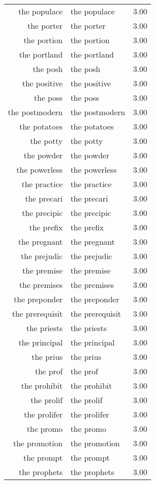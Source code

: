 \begin{table}[ht]
\begin{tabular}{rlr}
  the populace & the populace & 3.00 \\ 
  the porter & the porter & 3.00 \\ 
  the portion & the portion & 3.00 \\ 
  the portland & the portland & 3.00 \\ 
  the posh & the posh & 3.00 \\ 
  the positive & the positive & 3.00 \\ 
  the poss & the poss & 3.00 \\ 
  the postmodern & the postmodern & 3.00 \\ 
  the potatoes & the potatoes & 3.00 \\ 
  the potty & the potty & 3.00 \\ 
  the powder & the powder & 3.00 \\ 
  the powerless & the powerless & 3.00 \\ 
  the practice & the practice & 3.00 \\ 
  the precari & the precari & 3.00 \\ 
  the precipic & the precipic & 3.00 \\ 
  the prefix & the prefix & 3.00 \\ 
  the pregnant & the pregnant & 3.00 \\ 
  the prejudic & the prejudic & 3.00 \\ 
  the premise & the premise & 3.00 \\ 
  the premises & the premises & 3.00 \\ 
  the preponder & the preponder & 3.00 \\ 
  the prerequisit & the prerequisit & 3.00 \\ 
  the priests & the priests & 3.00 \\ 
  the principal & the principal & 3.00 \\ 
  the prius & the prius & 3.00 \\ 
  the prof & the prof & 3.00 \\ 
  the prohibit & the prohibit & 3.00 \\ 
  the prolif & the prolif & 3.00 \\ 
  the prolifer & the prolifer & 3.00 \\ 
  the promo & the promo & 3.00 \\ 
  the promotion & the promotion & 3.00 \\ 
  the prompt & the prompt & 3.00 \\ 
  the prophets & the prophets & 3.00 \\ 

\end{tabular}
\end{table}
